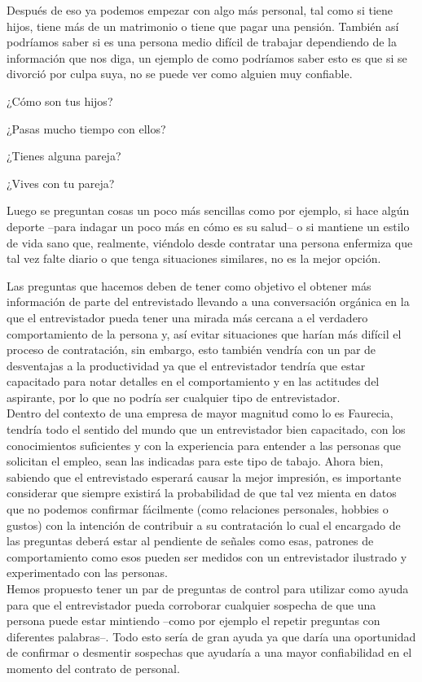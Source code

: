\documentclass[letterpaper,12pt]{article}
\begin{document}
\begin{sloppypar}
Después de eso ya podemos empezar con algo más personal, tal como si tiene hijos, tiene más de un matrimonio o tiene que pagar una pensión. También así podríamos saber si es una persona medio difícil de trabajar dependiendo de la información que nos diga, un ejemplo de como podríamos saber esto es que si se divorció por culpa suya, no se puede ver como alguien muy confiable.
\begin{center}
    ¿Cómo son tus hijos?

    ¿Pasas mucho tiempo con ellos?

    ¿Tienes alguna pareja?

    ¿Vives con tu pareja?
\end{center}
Luego se preguntan cosas un poco más sencillas como por ejemplo, si hace algún deporte --para indagar un poco más en cómo es su salud-- o si mantiene un estilo de vida sano que, realmente, viéndolo desde contratar una persona enfermiza que tal vez falte diario o que tenga situaciones similares, no es la mejor opción.

Las preguntas que hacemos deben de tener como objetivo el obtener más información de parte del entrevistado llevando a una conversación orgánica en la que el entrevistador pueda tener una mirada más cercana a el verdadero comportamiento de la persona y, así evitar situaciones que harían más difícil el proceso de contratación, sin embargo, esto también vendría con un par de desventajas a la productividad ya que el entrevistador tendría que estar capacitado para notar detalles en el comportamiento y en las actitudes del aspirante, por lo que no podría ser cualquier tipo de entrevistador. 
\vspace{0.3cm}\\ 
Dentro del contexto de una empresa de mayor magnitud como lo es Faurecia, tendría todo el sentido del mundo que un entrevistador bien capacitado, con los conocimientos suficientes y con la experiencia para entender a las personas que solicitan el empleo, sean las indicadas para este tipo de tabajo. Ahora bien, sabiendo que el entrevistado esperará causar la mejor impresión, es importante considerar que siempre existirá la probabilidad de que tal vez mienta en datos que no podemos confirmar fácilmente (como relaciones personales, hobbies o gustos)  con la intención de contribuir a su contratación lo cual el encargado de las preguntas deberá estar al pendiente de señales como esas, patrones de comportamiento como esos pueden ser medidos con un entrevistador ilustrado y experimentado con las personas. 
\vspace{0.3cm}\\ 
Hemos propuesto tener un par de preguntas de control para utilizar como ayuda para que el entrevistador pueda corroborar cualquier sospecha de que una persona puede estar mintiendo --como por ejemplo el repetir preguntas con diferentes palabras--. Todo esto sería de gran ayuda ya que daría una oportunidad de confirmar o desmentir sospechas que ayudaría a una mayor confiabilidad en el momento del contrato de personal.
\newpage

\end{sloppypar}
\end{document}
